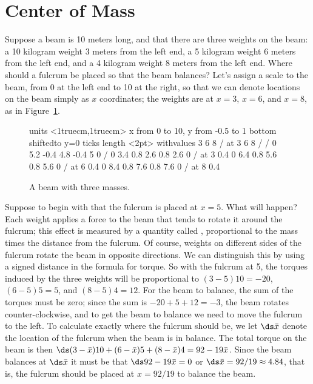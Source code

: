 \section{Center of Mass}\label{sec:centerofmass}

Suppose a beam is 10 meters long, and that there are three weights on
the beam: a 10 kilogram weight 3 meters from the left end, a 5
kilogram weight 6 meters from the left end, and a 4 kilogram weight 8
meters from the left end. Where should a fulcrum be placed so that the
beam balances? Let's assign a scale to the beam, from 0 at the left
end to 10 at the right, so that we can denote locations on the beam
simply as $x$ coordinates; the weights are at $x=3$, $x=6$, and $x=8$,
as in Figure~\ref{fig:massesonbeam}.

\begin{figure}[H]
\centerline{
\vbox{\beginpicture
\normalgraphs
\setcoordinatesystem units <1truecm,1truecm>
\setplotarea x from 0 to 10, y from -0.5 to 1
\axis bottom shiftedto y=0 ticks length <2pt>
  withvalues {3} {6} {8} / at 3 6 8 / /
\setlinear
{} 0 5.2 -0.4 4.8 -0.4 5 0 /
 0 3.4 0.8 2.6 0.8 2.6 0 /
 at 3 0.4
 0 6.4 0.8 5.6 0.8 5.6 0 /
 at 6 0.4
 0 8.4 0.8 7.6 0.8 7.6 0 /
 at 8 0.4
\endpicture}}
\caption{A beam with three masses.}
\label{fig:massesonbeam}
\end{figure}

Suppose to begin with that the fulcrum is placed at $x=5$. What will
happen? Each weight applies a force to the beam that tends to rotate
it around the fulcrum; this effect is measured by a quantity called
, proportional to the mass times the
distance from the fulcrum. Of course, weights on different sides of
the fulcrum rotate the beam in opposite directions. We can distinguish
this by using a signed distance in the formula for torque. So with the
fulcrum at 5, the torques induced by the three weights will be
proportional to $(3-5)10=-20$, $(6-5)5=5$, and $(8-5)4=12$. For the
beam to balance, the sum of the torques must be zero; since the sum is
$-20+5+12=-3$, the beam rotates counter-clockwise, and to get the beam
to balance we need to move the fulcrum to the left. To calculate
exactly where the fulcrum should be, we let $\ds \bar x$ denote the
location of the fulcrum when the beam is in balance. The total torque
on the beam is then $\ds (3-\bar x)10+(6-\bar x)5+(8-\bar x)4=92-19\bar
x$. Since the beam balances at $\ds \bar x$ it must be that
$\ds 92-19\bar x=0$ or $\ds \bar x=92/19\approx 4.84$, that is, the fulcrum
should be placed at $x=92/19$ to balance the beam.

